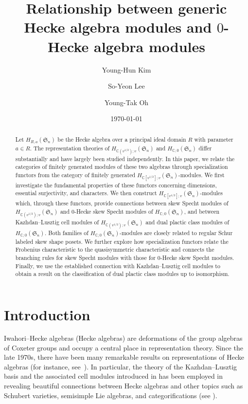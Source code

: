 \documentclass[12pt, reqno]{amsart}
\title[Relationship between generic Hecke algebra modules and $0$-Hecke modules]{Relationship between generic Hecke algebra modules and $0$-Hecke algebra modules}
\author[Y.-H. Kim]{Young-Hun Kim}
\author[S.-Y. Lee]{So-Yeon Lee}
\author[Y.-T. Oh]{Young-Tak Oh}
\date{\today}
\theoremstyle{plain}
\theoremstyle{definition}
\numberwithin{equation}{section}
\numberwithin{figure}{section}
\numberwithin{table}{section}
\begin{document}
\begin{abstract}
Let $H_{R,a}(\mathfrak{S}_n)$ be the Hecke algebra over a principal ideal domain $R$ with parameter $a\in R$.
The representation theories of 
$H_{\mathbb{C}(v^{1/2});v}(\mathfrak{S}_n)$ and $H_{\mathbb{C};0}(\mathfrak{S}_n)$ differ substantially and have largely been studied independently.
In this paper, we relate the categories of finitely generated modules of these two algebras through specialization functors from the category of finitely generated $H_{\mathbb{C}[v^{1/2}];v}(\mathfrak{S}_n)$-modules.
We first investigate the fundamental properties of these functors concerning dimensions, essential surjectivity, and characters.
We then construct $H_{\mathbb{C}[v^{1/2}];v}(\mathfrak{S}_n)$-modules which, through these functors, provide connections between skew Specht modules of $H_{\mathbb{C}(v^{1/2});v}(\mathfrak{S}_n)$ and $0$-Hecke skew Specht modules of $H_{\mathbb{C};0}(\mathfrak{S}_n)$, and between Kazhdan--Lusztig cell modules of $H_{\mathbb{C}(v^{1/2});v}(\mathfrak{S}_n)$ and dual plactic class modules of $H_{\mathbb{C};0}(\mathfrak{S}_n)$.
Both families of $H_{\mathbb{C};0}(\mathfrak{S}_n)$-modules are closely related to regular Schur labeled skew shape posets.
We further explore how specialization functors relate the Frobenius characteristic to the quasisymmetric characteristic and connects the branching rules for skew Specht modules with those for $0$-Hecke skew Specht modules.
Finally, we use the established connection with Kazhdan--Lusztig cell modules to obtain a  result on the classification of dual plactic class modules up to isomorphism.
\end{abstract}





\maketitle



\tableofcontents


\section{Introduction}





Iwahori--Hecke algebras (Hecke algebras)  are  deformations of the group algebras of Coxeter groups and occupy a central place in representation theory.
Since the late 1970s, there have been 
many remarkable results on  representations of Hecke algebras (for instance, see~\cite{79KL, 86DJ, 96Ariki, 96GL, 06Geck, 09BK}).
In particular, the theory of the Kazhdan--Lusztig basis and the associated cell modules introduced in \cite{79KL} has been employed in revealing  beautiful connections between Hecke algebras and other topics such as Schubert varieties,  semisimple Lie algebras, and  categorifications  (see \cite{80KL,81BK,00Ariki,14EBW}).
\end{document}
